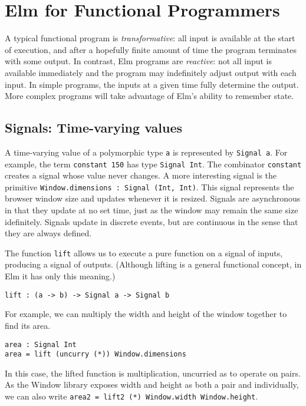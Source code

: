 \documentclass{article}
\begin{document}
\section{Elm for Functional
Programmers}\label{elm-for-functional-programmers}

A typical functional program is \emph{transformative}: all input is
available at the start of execution, and after a hopefully finite amount
of time the program terminates with some output. In contrast, Elm
programs are \emph{reactive}: not all input is available immediately and
the program may indefinitely adjust output with each input. In simple
programs, the inputs at a given time fully determine the output. More
complex programs will take advantage of Elm's ability to remember state.

\subsection{Signals: Time-varying
values}\label{signals-time-varying-values}

A time-varying value of a polymorphic type \texttt{a} is represented by
\texttt{Signal a}. For example, the term \texttt{constant 150} has type
\texttt{Signal Int}. The combinator \texttt{constant} creates a signal
whose value never changes. A more interesting signal is the primitive
\texttt{Window.dimensions : Signal (Int, Int)}. This signal represents
the browser window size and updates whenever it is resized. Signals are
asynchronous in that they update at no set time, just as the window may
remain the same size idefinitely. Signals update in discrete events, but
are continuous in the sense that they are always defined.

The function \texttt{lift} allows us to execute a pure function on a
signal of inputs, producing a signal of outputs. (Although lifting is a
general functional concept, in Elm it has only this meaning.)

\begin{verbatim}
lift : (a -> b) -> Signal a -> Signal b
\end{verbatim}

For example, we can multiply the width and height of the window together
to find its area.

\begin{verbatim}
area : Signal Int
area = lift (uncurry (*)) Window.dimensions
\end{verbatim}

In this case, the lifted function is multiplication, uncurried as to
operate on pairs. As the Window library exposes width and height as both
a pair and individually, we can also write
\texttt{area2 = lift2 (*) Window.width Window.height}.
\end{document}
